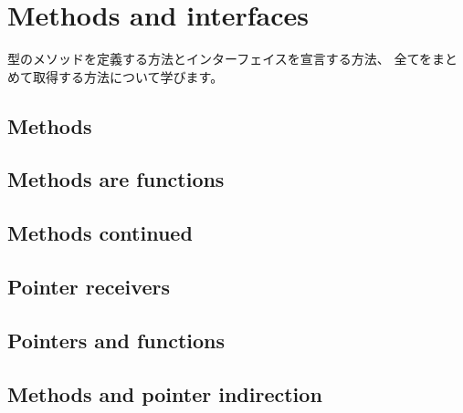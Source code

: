 \section{Methods and interfaces}

型のメソッドを定義する方法とインターフェイスを宣言する方法、
全てをまとめて取得する方法について学びます。

\subsection{Methods}




\subsection{Methods are functions}




\subsection{Methods continued}




\subsection{Pointer receivers}




\subsection{Pointers and functions}




\subsection{Methods and pointer indirection}




